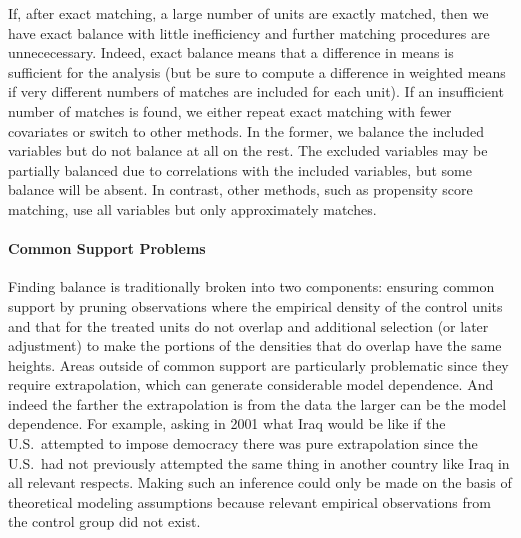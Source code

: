 \documentclass[11pt,titlepage]{article}
\begin{document}
If, after exact matching, a large number of units are exactly matched,
then we have exact balance with little inefficiency and further
matching procedures are unnececessary.  Indeed, exact balance means
that a difference in means is sufficient for the analysis (but be sure
to compute a difference in weighted means if very different numbers of
matches are included for each unit).  If an insufficient number of
matches is found, we either repeat exact matching with fewer
covariates or switch to other methods.  In the former, we balance the
included variables but do not balance at all on the rest.  The
excluded variables may be partially balanced due to correlations with
the included variables, but some balance will be absent.  In contrast,
other methods, such as propensity score matching, use all variables
but only approximately matches.

\paragraph{Common Support Problems}
Finding balance is traditionally broken into two components: ensuring
common support by pruning observations where the empirical density of
the control units and that for the treated units do not overlap and
additional selection (or later adjustment) to make the portions of the
densities that do overlap have the same heights.  Areas outside of
common support are particularly problematic since they require
extrapolation, which can generate considerable model dependence.  And
indeed the farther the extrapolation is from the data the larger can
be the model dependence.  For example, asking in 2001 what Iraq would
be like if the U.S.\ attempted to impose democracy there was pure
extrapolation since the U.S.\ had not previously attempted the same
thing in another country like Iraq in all relevant respects.  Making
such an inference could only be made on the basis of theoretical
modeling assumptions because relevant empirical observations from the
control group did not exist.
\end{document}
